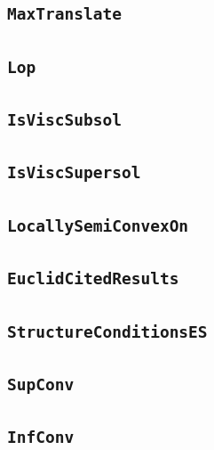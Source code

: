 \documentclass[11pt]{amsart}
\theoremstyle{definition}
\begin{document}
\subsection{\texorpdfstring{\texttt{MaxTranslate}}{MaxTranslate}}\label{node:MaxTranslate}


\subsection{\texorpdfstring{\texttt{Lop}}{Lop}}\label{node:Lop}


\subsection{\texorpdfstring{\texttt{IsViscSubsol}}{IsViscSubsol}}\label{node:IsViscSubsol}


\subsection{\texorpdfstring{\texttt{IsViscSupersol}}{IsViscSupersol}}\label{node:IsViscSupersol}


\subsection{\texorpdfstring{\texttt{LocallySemiConvexOn}}{LocallySemiConvexOn}}\label{node:LocallySemiConvexOn}


\subsection{\texorpdfstring{\texttt{EuclidCitedResults}}{EuclidCitedResults}}\label{node:EuclidCitedResults}


\subsection{\texorpdfstring{\texttt{StructureConditionsES}}{StructureConditionsES}}\label{node:StructureConditionsES}


\subsection{\texorpdfstring{\texttt{SupConv}}{SupConv}}\label{node:SupConv}


\subsection{\texorpdfstring{\texttt{InfConv}}{InfConv}}\label{node:InfConv}

\end{document}
